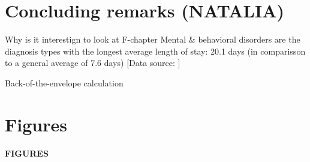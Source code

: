 \documentclass[11pt, a4paper]{article} %
\begin{document}
\section{Concluding remarks (NATALIA)}\label{sec:conclusion}

Why is it interestign to look at F-chapter
Mental \& behavioral disorders are the diagnosis types with the longest average length of stay: 20.1 days (in comparisson to a general average of 7.6 days) [Data source: \cite[p. 5]{statistisches2012diagnosedaten} ]

Back-of-the-envelope calculation






\newpage






\newpage
\TODO\section{Figures}
\vspace*{\fill}
{\Huge \begin{center}\textbf{FIGURES}\end{center}}
\vspace*{\fill}\clearpage
\end{document}
